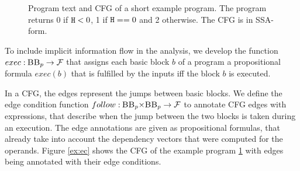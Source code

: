 \begin{figure}
\begin{minipage}{.55\textwidth}
    \end{minipage}\hfill
    \caption{Program text and CFG of a short example program. The program returns 0 if $\mathtt{H} < 0$, 1 if $\mathtt{H} == 0$ and 2 otherwise. The CFG is in SSA-form.}
    \label{fig:doubleIf}
\end{figure}

To include implicit information flow in the analysis, we develop the function $exec: \: \mbb_p \to \mbform$ that assigns each basic block $b$ of a program a propositional formula $exec(b)$ that is fulfilled by the inputs iff the block $b$ is executed. 

In a CFG, the edges represent the jumps between basic blocks. We define the edge condition function $follow: \: \mbb_p \times \mbb_p \to \mbform$ to annotate CFG edges with expressions, that describe when the jump between the two blocks is taken during an execution. The edge annotations are given as propositional formulas, that already take into account the dependency vectors that were computed for the operands. Figure \ref{ex:ec} shows the CFG of the example program \ref{fig:doubleIf} with edges being annotated with their edge conditions.


    

